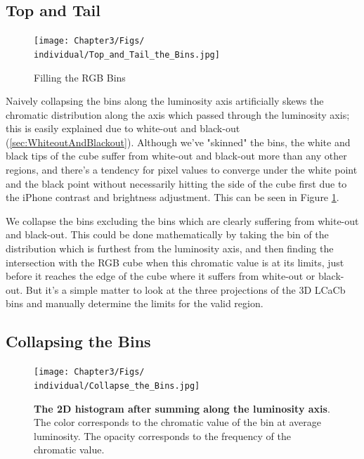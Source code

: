 \subsection{Top and Tail}\label{sec:TopAndTail}

\begin{figure}[h!] %
  \centering
    \texttt{[image: Chapter3/Figs/\\individual/Top\_and\_Tail\_the\_Bins.jpg]}
        \caption{Filling the RGB Bins}  \label{fig:Top_and_Tail_the_Bins}
    \end{figure}


Naively collapsing the bins along the luminosity axis artificially skews the chromatic distribution along the axis which passed through the luminosity axis; this is easily explained due to white-out and black-out (\ref{sec:WhiteoutAndBlackout}). 
Although we've "skinned" the bins, the white and black tips of the cube suffer from white-out and black-out more than any other regions, and there's a tendency for pixel values to converge under the white point and the black point without necessarily hitting the side of the cube first due to the iPhone contrast and brightness adjustment. This can be seen in Figure   \ref{fig:Top_and_Tail_the_Bins}. 

We collapse the bins excluding the bins which are clearly suffering from white-out and black-out. This could be done mathematically by taking the bin of the distribution which is furthest from the luminosity axis, and then finding the intersection with the RGB cube when this chromatic value is at its limits, just before it reaches the edge of the cube where it suffers from white-out or black-out. But it's a simple matter to look at the three projections of the 3D LCaCb bins and manually determine the limits for the valid region.


\subsection{Collapsing the Bins}\label{sec:CollapsingTheBins}

\begin{figure}[h!]
  \centering
    \texttt{[image: Chapter3/Figs/\\individual/Collapse\_the\_Bins.jpg]}
        \caption{\textbf{The 2D histogram after summing along the luminosity axis}. The color corresponds to the chromatic value of the bin at average luminosity. The opacity corresponds to the frequency of the chromatic value. }  \label{fig:Collapse_the_Bins}
    \end{figure}
    
